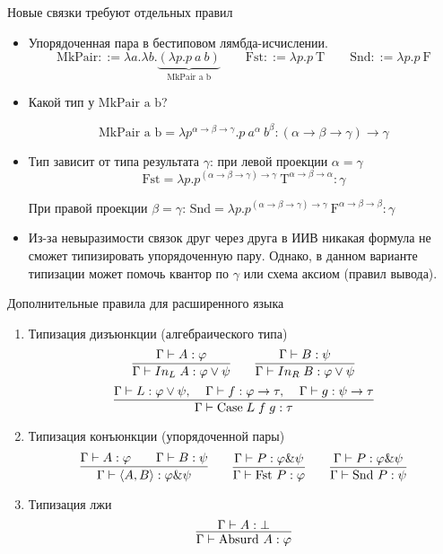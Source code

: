 \documentclass[aspectratio=169]{beamer}
\begin{document}
\begin{frame}{Новые связки требуют отдельных правил}
\begin{itemize}\item Упорядоченная пара в бестиповом лямбда-исчислении.
$$\text{MkPair} ::= \lambda a.\lambda b.\underbrace{\left(\lambda p.p\ a\ b\right)}_{\text{MkPair a b}}
\quad\quad\text{Fst} ::= \lambda p.p\ \text{T}
\quad\quad\text{Snd} ::= \lambda p.p\ \text{F}$$
\item Какой тип у $\text{MkPair a b}$?

$$\text{MkPair a b} = \lambda p^{\alpha\rightarrow\beta\rightarrow\gamma}.p\ a^{\alpha}\ b^{\beta} : (\alpha\rightarrow\beta\rightarrow\gamma)\rightarrow\gamma$$

\item Тип зависит от типа результата $\gamma$: при левой проекции $\alpha = \gamma$ $$\text{Fst} = \lambda p.p^{(\alpha\rightarrow\beta\rightarrow\gamma)\rightarrow\gamma}\ \text{T}^{\alpha\rightarrow\beta\rightarrow\alpha} : \gamma$$

При правой проекции $\beta = \gamma$: $\text{Snd} = \lambda p.p^{(\alpha\rightarrow\beta\rightarrow\gamma)\rightarrow\gamma}\ \text{F}^{\alpha\rightarrow\beta\rightarrow\beta} : \gamma$

\item Из-за невыразимости связок друг через друга в ИИВ никакая формула не сможет типизировать упорядоченную пару. 
Однако, в данном варианте типизации может помочь квантор по $\gamma$ или схема аксиом (правил вывода).
\end{itemize}
\end{frame}

\begin{frame}{Дополнительные правила для расширенного языка}
\begin{enumerate}
	\item Типизация дизъюнкции (алгебраического типа)\[
	\infer{\Gamma \vdash In_L \; A: \varphi \vee \psi}{\Gamma\vdash A: \varphi}
	\quad\quad
	\infer{\Gamma \vdash In_R \; B: \varphi \vee \psi}{\Gamma\vdash B: \psi}
	\]\vspace{-0.5cm}
	\[
	\infer{\Gamma \vdash \text{Case} \; L \; f \; g : \tau}{\Gamma \vdash L: \varphi \vee \psi, \;\;\;\; \Gamma \vdash f : \varphi \to \tau, \;\;\;\; \Gamma \vdash g: \psi \to \tau}
	\]

	\item Типизация конъюнкции (упорядоченной пары)
	\[
	\infer{\Gamma \vdash \langle A, B \rangle : \varphi \text{\&} \psi}{\Gamma\vdash A: \varphi && \Gamma\vdash B: \psi}
	\quad\quad
	\infer{\Gamma \vdash \text{Fst}\ P : \varphi}{\Gamma \vdash P: \varphi \text{\&} \psi}
	\quad\quad
	\infer{\Gamma \vdash \text{Snd}\ P : \psi}{\Gamma \vdash P: \varphi \text{\&} \psi}
	\]

	\item Типизация лжи
	\[
	\infer{\Gamma \vdash \text{Absurd}\ A : \varphi}{\Gamma \vdash A : \bot}
	\]
\end{enumerate}
\end{frame}
\end{document}
